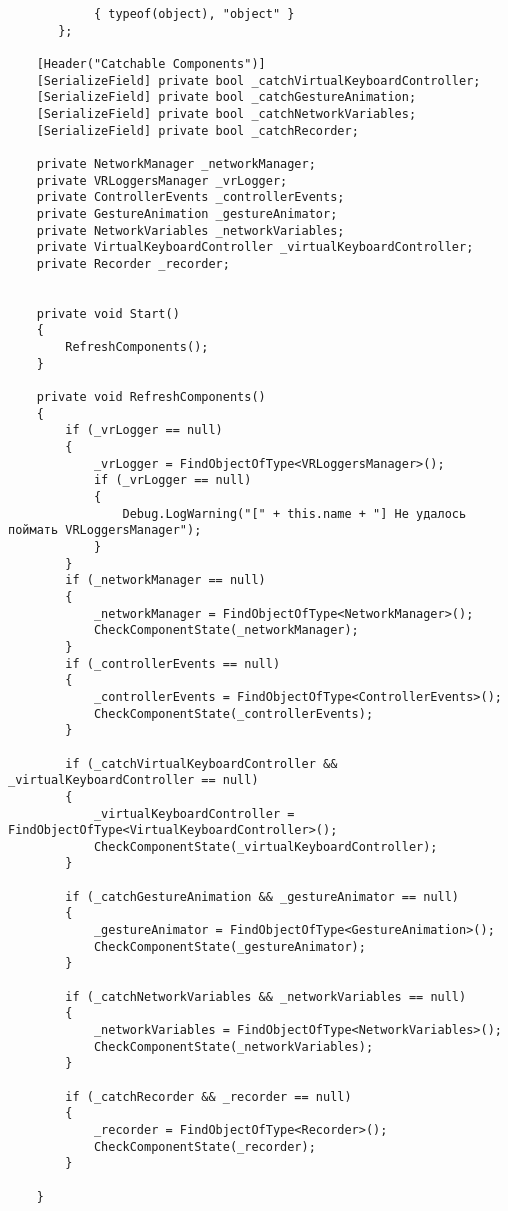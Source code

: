 \begin{verbatim}
            { typeof(object), "object" }
       };

    [Header("Catchable Components")]
    [SerializeField] private bool _catchVirtualKeyboardController;
    [SerializeField] private bool _catchGestureAnimation;
    [SerializeField] private bool _catchNetworkVariables;
    [SerializeField] private bool _catchRecorder;
    
    private NetworkManager _networkManager;
    private VRLoggersManager _vrLogger;
    private ControllerEvents _controllerEvents;
    private GestureAnimation _gestureAnimator;
    private NetworkVariables _networkVariables;
    private VirtualKeyboardController _virtualKeyboardController;
    private Recorder _recorder;


    private void Start()
    {
        RefreshComponents();
    }

    private void RefreshComponents()
    {
        if (_vrLogger == null)
        {
            _vrLogger = FindObjectOfType<VRLoggersManager>();
            if (_vrLogger == null)
            {
                Debug.LogWarning("[" + this.name + "] Не удалось поймать VRLoggersManager");
            }
        }
        if (_networkManager == null)
        {
            _networkManager = FindObjectOfType<NetworkManager>();
            CheckComponentState(_networkManager);
        }
        if (_controllerEvents == null)
        {
            _controllerEvents = FindObjectOfType<ControllerEvents>();
            CheckComponentState(_controllerEvents);
        }

        if (_catchVirtualKeyboardController && _virtualKeyboardController == null)
        {
            _virtualKeyboardController = FindObjectOfType<VirtualKeyboardController>();
            CheckComponentState(_virtualKeyboardController);
        }

        if (_catchGestureAnimation && _gestureAnimator == null)
        {
            _gestureAnimator = FindObjectOfType<GestureAnimation>();
            CheckComponentState(_gestureAnimator);
        }

        if (_catchNetworkVariables && _networkVariables == null)
        {
            _networkVariables = FindObjectOfType<NetworkVariables>();
            CheckComponentState(_networkVariables);
        }

        if (_catchRecorder && _recorder == null)
        {
            _recorder = FindObjectOfType<Recorder>();
            CheckComponentState(_recorder);
        }

    }


\end{verbatim}
